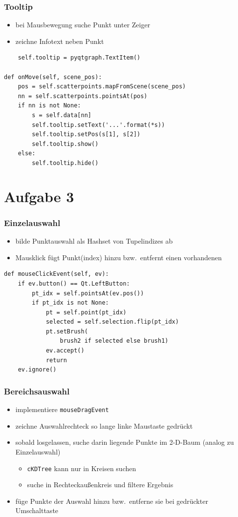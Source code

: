 \documentclass{beamer}
\begin{document}
    \begin{frame}[containsverbatim]
    	\frametitle{Tooltip}
    	\begin{itemize}
    		\setlength\itemsep{1em}
    		\item bei Mausbewegung suche Punkt unter Zeiger
    		\item zeichne Infotext neben Punkt
    	\end{itemize}
    	\begin{lstlisting}
	self.tooltip = pyqtgraph.TextItem()

def onMove(self, scene_pos):
	pos = self.scatterpoints.mapFromScene(scene_pos)
	nn = self.scatterpoints.pointsAt(pos)
	if nn is not None:
		s = self.data[nn]
		self.tooltip.setText('...'.format(*s))
		self.tooltip.setPos(s[1], s[2])
		self.tooltip.show()
	else:
		self.tooltip.hide()
    	\end{lstlisting}
    \end{frame}

    \section{Aufgabe 3}
    \begin{frame}[containsverbatim]
    	\frametitle{Einzelauswahl}
    	\begin{itemize}
    		\setlength\itemsep{1em}
    		\item bilde Punktauswahl als Hashset von Tupelindizes ab
    		\item Mausklick fügt Punkt(index) hinzu bzw.\ entfernt einen vorhandenen
    	\end{itemize}
    	\begin{lstlisting}
def mouseClickEvent(self, ev):
	if ev.button() == Qt.LeftButton:
		pt_idx = self.pointsAt(ev.pos())
		if pt_idx is not None:
			pt = self.point(pt_idx)
			selected = self.selection.flip(pt_idx)
			pt.setBrush(
				brush2 if selected else brush1)
			ev.accept()
			return
	ev.ignore()
			\end{lstlisting}
    \end{frame}

    \begin{frame}[containsverbatim]
    	\frametitle{Bereichsauswahl}
    	\begin{itemize}
    		\setlength\itemsep{1em}
    		\item implementiere \lstinline{mouseDragEvent}
    		\item zeichne Auswahlrechteck so lange linke Maustaste gedrückt
    		\item sobald losgelassen, suche darin liegende Punkte im 2-D-Baum (analog zu Einzelauswahl)
    			\begin{itemize}
    				\item \lstinline{cKDTree} kann nur in Kreisen suchen
    				\item suche in Rechteckaußenkreis und filtere Ergebnis
    			\end{itemize}
    		\item füge Punkte der Auswahl hinzu bzw.\ entferne sie bei gedrückter Umschalttaste
    	\end{itemize}
    \end{frame}
\end{document}
